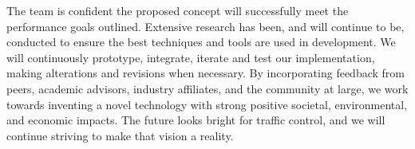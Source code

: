 \documentclass{article}
\begin{document}
The team is confident the proposed concept will successfully meet the performance goals outlined.
Extensive research has been, and will continue to be, conducted to ensure the best techniques and tools are used in development.
 We will continuously prototype, integrate, iterate and test our implementation, making alterations and revisions when necessary.
By incorporating feedback from peers, academic advisors, industry affiliates, and the community at large, we work towards inventing a novel technology with strong positive societal, environmental, and economic impacts.
 The future looks bright for traffic control, and we will continue striving to make that vision a reality.\\

\newpage
{}




\end{document}
